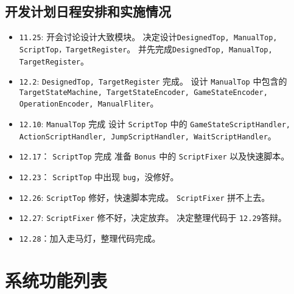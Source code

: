 \documentclass[12pt, a4paper]{ctexart}
\begin{document}
\subsection{开发计划日程安排和实施情况}
\begin{itemize}
\item \texttt{11.25}: 开会讨论设计大致模块。
                决定设计\texttt{DesignedTop, ManualTop, ScriptTop，TargetRegister}。
                并先完成\texttt{DesignedTop, ManualTop, TargetRegister}。
                
\item \texttt{12.2}: \texttt{DesignedTop, TargetRegister} 完成。
                设计 \texttt{ManualTop} 中包含的 \texttt{TargetStateMachine, TargetStateEncoder, GameStateEncoder, OperationEncoder, ManualFliter}。
                
\item \texttt{12.10}: \texttt{ManualTop} 完成
                设计 \texttt{ScriptTop} 中的 \texttt{GameStateScriptHandler, ActionScriptHandler, JumpScriptHandler, WaitScriptHandler}。
                
\item \texttt{12.17}： \texttt{ScriptTop} 完成
                准备 \texttt{Bonus} 中的 \texttt{ScriptFixer} 以及快速脚本。
                
\item \texttt{12.23}： \texttt{ScriptTop} 中出现 \texttt{bug}，没修好。
\item \texttt{12.26}: \texttt{ScriptTop} 修好，快速脚本完成。
                        \texttt{ScriptFixer} 拼不上去。
\item \texttt{12.27}: \texttt{ScriptFixer} 修不好，决定放弃。
                      决定整理代码于 \texttt{12.29}答辩。
\item \texttt{12.28}：加入走马灯，整理代码完成。
\end{itemize}
\section{系统功能列表}
\end{document}
